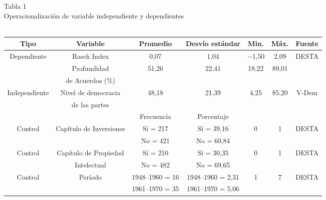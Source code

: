 \documentclass[a4paper]{tufte-handout}
\begin{document}

\begin{table}[h]
  \centering
  \selectfont
   \smallskip\noindent\small Tabla 1 \\ Operacionalización de variable independiente y dependientes \\~\\
  \begin{tabular}{c c c c c c c}
    \toprule
    Tipo & Variable & Promedio & Desvío estándar & Min. & Máx. & Fuente \\
    \midrule
    \multirow{3}{*}{Dependiente} & Rasch Index & 0,07 & 1,04 & $-$1,50 & 2,09 & \multirow{3}{*}{DESTA} \\ 
     & Profundidad & \multirow{2}{*}{51,26} & \multirow{2}{*}{22,41} & \multirow{2}{*}{18,22} & \multirow{2}{*}{89,01} & \\ 
     & de Acuerdos (\%) & & & & & \\ \midrule
    \multirow{2}{*}{Independiente} & Nivel de democracia & \multirow{2}{*}{48,18} & \multirow{2}{*}{21,39} & \multirow{2}{*}{4,25} & \multirow{2}{*}{85,20} & \multirow{2}{*}{V-Dem} \\
    & de las partes & & & & & \\ \midrule
    & & Frecuencia	& Porcentaje & & & \\ \midrule
    \multirow{2}{*}{Control} & \multirow{2}{*}{Capítulo de Inversiones} & Sí = 217 & Sí = 39,16 & \multirow{2}{*}{0} & \multirow{2}{*}{1} & \multirow{2}{*}{DESTA} \\ 
    & & No = 421 & No = 60,84 & & & \\ \midrule
    \multirow{2}{*}{Control} & Capítulo de Propiedad & Sí = 210 & Sí = 30,35 & \multirow{2}{*}{0} & \multirow{2}{*}{1} & \multirow{2}{*}{DESTA} \\ 
    & Intelectual & No = 482 & No = 69,65 & & & \\ \midrule
    \multirow{7}{*}{Control} & \multirow{7}{*}{Período} & 1948--1960 = 16 & 1948--1960 = 2,31 & \multirow{7}{*}{1} & \multirow{7}{*}{7} & \multirow{7}{*}{DESTA} \\
    & & 1961--1970 = 35 & 1961--1970 = 5,06 & & & \\ 

\end{tabular}
\end{table}
\end{document}
